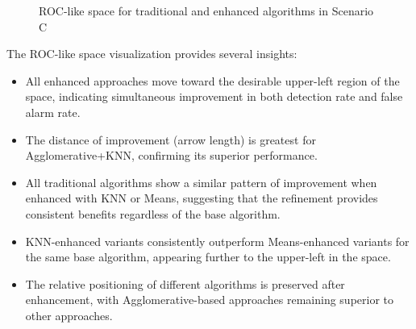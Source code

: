 \begin{figure}[htbp]
    \caption{ROC-like space for traditional and enhanced algorithms in Scenario C}
    \label{fig:roc_space}
\end{figure}

The ROC-like space visualization provides several insights:

\begin{itemize}
    \item All enhanced approaches move toward the desirable upper-left region of the space, indicating simultaneous improvement in both detection rate and false alarm rate.
    
    \item The distance of improvement (arrow length) is greatest for Agglomerative+KNN, confirming its superior performance.
    
    \item All traditional algorithms show a similar pattern of improvement when enhanced with KNN or Means, suggesting that the refinement provides consistent benefits regardless of the base algorithm.
    
    \item KNN-enhanced variants consistently outperform Means-enhanced variants for the same base algorithm, appearing further to the upper-left in the space.
    
    \item The relative positioning of different algorithms is preserved after enhancement, with Agglomerative-based approaches remaining superior to other approaches.
\end{itemize}

